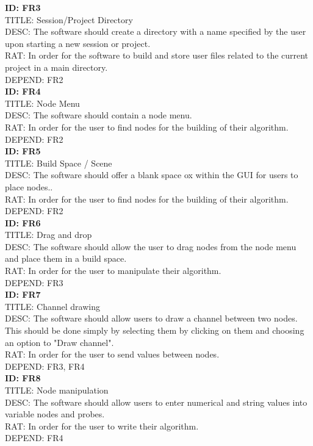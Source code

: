 \documentclass[journal,10pt,onecolumn,compsoc]{IEEEtran} \usepackage[margin=1.0in]{geometry} \usepackage{pdfpages} \usepackage{graphicx}
\begin{document}
\noindent
\textbf{ID: FR3}\\
TITLE: Session/Project Directory\\
DESC: The software should create a directory with a name specified by the user upon starting a new session or project.\\
RAT: In order for the software to build and store user files related to the current project in a main directory.\\
DEPEND: FR2\\

\noindent
\textbf{ID: FR4}\\
TITLE: Node Menu\\
DESC: The software should contain a node menu.\\
RAT: In order for the user to find nodes for the building of their algorithm.\\
DEPEND: FR2\\

\noindent
\textbf{ID: FR5}\\
TITLE: Build Space / Scene\\
DESC: The software should offer a blank space ox within the GUI for users to place nodes..\\
RAT: In order for the user to find nodes for the building of their algorithm.\\
DEPEND: FR2\\

\noindent
\textbf{ID: FR6}\\
TITLE: Drag and drop\\
DESC: The software should allow the user to drag nodes from the node menu and place them in a build space.\\
RAT: In order for the user to manipulate their algorithm.\\
DEPEND: FR3\\

\noindent
\textbf{ID: FR7}\\
TITLE: Channel drawing\\
DESC: The software should allow users to draw a channel between two nodes. 
This should be done simply by selecting them by clicking on them and choosing an option to "Draw channel".\\
RAT: In order for the user to send values between nodes.\\
DEPEND: FR3, FR4\\

\noindent
\textbf{ID: FR8}\\
TITLE: Node manipulation\\
DESC: The software should allow users to enter numerical and string values into variable nodes and probes.\\
RAT: In order for the user to write their algorithm.\\
DEPEND: FR4\\
\end{document}
